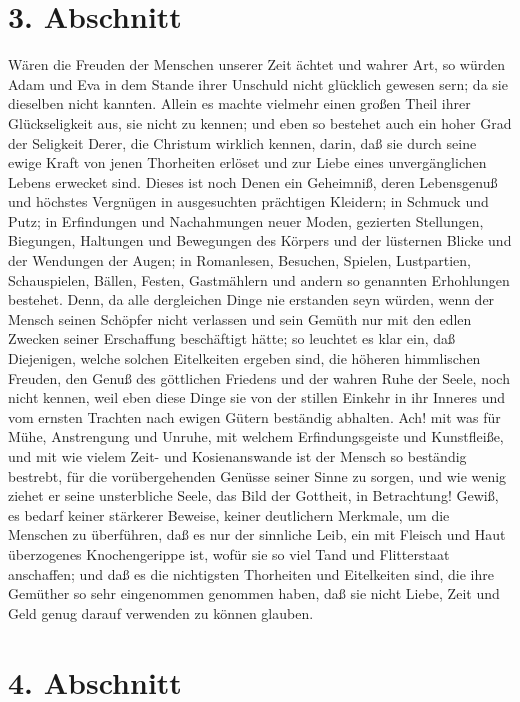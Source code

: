 \section{3. Abschnitt}

Wären die Freuden der Menschen unserer Zeit ächtet und wahrer Art, so würden Adam und Eva in dem Stande ihrer Unschuld nicht glücklich gewesen sern; da sie dieselben nicht kannten. Allein es machte vielmehr einen großen Theil ihrer Glückseligkeit aus, sie nicht zu kennen; und eben so bestehet auch ein hoher Grad der Seligkeit Derer, die Christum wirklich kennen, darin, daß sie durch seine ewige Kraft von jenen Thorheiten erlöset und zur Liebe eines unvergänglichen Lebens erwecket sind. Dieses ist noch Denen ein Geheimniß, deren Lebensgenuß und höchstes Vergnügen in ausgesuchten prächtigen Kleidern; in Schmuck und Putz; in Erfindungen und Nachahmungen neuer Moden, gezierten Stellungen, Biegungen, Haltungen und Bewegungen des Körpers und der lüsternen Blicke und der Wendungen der Augen; in Romanlesen, Besuchen, Spielen, Lustpartien, Schauspielen, Bällen, Festen, Gastmählern und andern so genannten Erhohlungen bestehet. Denn, da alle dergleichen Dinge nie erstanden seyn würden, wenn der Mensch seinen Schöpfer nicht verlassen und sein Gemüth nur mit den edlen Zwecken seiner Erschaffung beschäftigt hätte; so leuchtet es klar ein, daß Diejenigen, welche solchen Eitelkeiten ergeben sind, die höheren himmlischen Freuden, den Genuß des göttlichen Friedens und der wahren Ruhe der Seele, noch nicht kennen, weil eben diese Dinge sie von der stillen Einkehr in ihr Inneres und vom ernsten Trachten nach ewigen Gütern beständig abhalten. Ach! mit was für Mühe, Anstrengung und Unruhe, mit welchem Erfindungsgeiste und Kunstfleiße, und mit wie vielem Zeit- und Kosienanswande ist der Mensch so beständig bestrebt, für die vorübergehenden Genüsse seiner Sinne zu sorgen, und wie wenig ziehet er seine unsterbliche Seele, das Bild der Gottheit, in Betrachtung! Gewiß, es bedarf keiner stärkerer Beweise, keiner deutlichern Merkmale, um die Menschen zu überführen, daß es nur der sinnliche Leib, ein mit Fleisch und Haut überzogenes Knochengerippe ist, wofür sie so viel Tand und Flitterstaat anschaffen; und daß es die nichtigsten Thorheiten und Eitelkeiten sind, die ihre Gemüther so sehr eingenommen genommen haben, daß sie nicht Liebe, Zeit und Geld genug darauf verwenden zu können glauben.

\section{4. Abschnitt}

